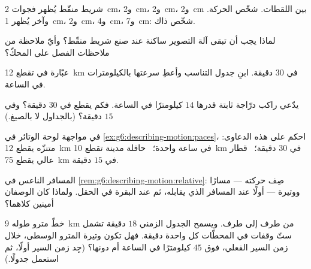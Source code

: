 \begin{exercise}[$\star$]\label{exo:g6:describing-motion:4}
شريط منقّط يُظهر فجوات \qty{2}{cm}، و\qty{2}{cm}، و\qty{2}{cm}،
و\qty{2}{cm} بين اللقطات. شخّص الحركة. وآخر يُظهر \qty{1}{cm}،
و\qty{2}{cm}، و\qty{4}{cm}، و\qty{7}{cm}: شخّص ذاك.
\end{exercise}

\begin{exercise}[$\star$]\label{exo:g6:describing-motion:5}
لماذا يجب أن تبقى آلة التصوير ساكنة عند صنع شريط منقّط؟ وأيّ
ملاحظة من ملاحظات الفصل على المحكّ؟
\end{exercise}

\begin{exercise}[$\star$]\label{exo:g6:describing-motion:6}
عبّارة في  تقطع \qty{12}{km} في $30$ دقيقة. ابنِ
جدول التناسب وأعطِ سرعتها بالكيلومترات في الساعة.
\end{exercise}

\begin{exercise}[$\star$]\label{exo:g6:describing-motion:7}
يدّعي راكب درّاجة  ثابتة قدرها $14$ كيلومترًا في الساعة.
فكم يقطع في $30$ دقيقة؟ وفي $15$ دقيقة؟ (بالجداول لا
بالصيغ.)
\end{exercise}

\begin{exercise}[$\star$]\label{exo:g6:describing-motion:8}
في مواجهة لوحة الوتائر في
\cref{ex:g6:describing-motion:paces}، احكم على هذه الدعاوى:
متنزّه يقطع \qty{12}{km} في ساعة واحدة؛ \ حافلة مدينة تقطع
\qty{10}{km} في $30$ دقيقة؛ \ قطار عالي  يقطع
\qty{75}{km} في $15$ دقيقة.
\end{exercise}

\begin{exercise}[$\star\star$]\label{exo:g6:describing-motion:9}
المسافر الناعس في
\cref{rem:g6:describing-motion:relative}: صِف حركته --- مسارًا
ووتيرة --- أولًا عند المسافر الذي يقابله، ثم عند البقرة في
الحقل. ولماذا كان الوصفان أمينين كلاهما؟
\end{exercise}

\begin{exercise}[$\star\star$]\label{exo:g6:describing-motion:10}
خطّ مترو طوله \qty{9}{km} من طرف إلى طرف. ويسمح الجدول الزمني
 $18$ دقيقة تشمل ستّ وقفات في المحطّات  كل واحدة دقيقة. فهل
تكون وتيرة المترو الوسطى، خلال زمن السير الفعلي، فوق $45$
كيلومترًا في الساعة أم دونها؟ (جِد زمن السير أولًا، ثم استعمل
جدولًا.)
\end{exercise}


